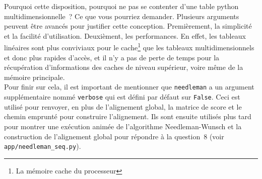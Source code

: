 \documentclass[12pt]{article}
\begin{document}
Pourquoi cette disposition, pourquoi ne pas se contenter d'une table python multidimensionnelle~? Ce que vous pourriez demander. Plusieurs arguments peuvent être avancés pour justifier cette conception. Premièrement, la simplicité et la facilité d'utilisation. Deuxièment, les performances. En effet, les tableaux linéaires sont plus conviviaux pour le cache\footnote{La mémoire cache du processeur} que les tableaux multidimensionnels et donc plus rapides d'accès, et il n'y a pas de perte de temps pour la récupération d'informations des caches de niveau supérieur, voire même de la mémoire principale.\\
Pour finir sur cela, il est important de mentionner que \texttt{needleman} a un argument supplémentaire nommé \texttt{verbose} qui est défini par défaut sur \texttt{False}. Ceci est utilisé pour renvoyer, en plus de l'alignement global, la matrice de score et le chemin emprunté pour construire l'alignement. Ils sont ensuite utilisés plus tard pour montrer une exécution animée de l'algorithme Needleman-Wunsch et la construction de l'alignement global pour répondre à la question~8 (voir \texttt{app/needleman\_seq.py}).

\end{document}
